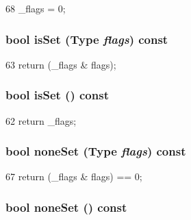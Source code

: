 \begin{DoxyCode}
68 { _flags = 0; }
\end{DoxyCode}
\hypertarget{classFlags_aaf4d0865ccb7b4e5278a619ee93e1241}{
\subsubsection[{isSet}]{\setlength{\rightskip}{0pt plus 5cm}bool isSet ({\bf Type} {\em flags}) const}}
\label{classFlags_aaf4d0865ccb7b4e5278a619ee93e1241}



\begin{DoxyCode}
63 { return (_flags & flags); }
\end{DoxyCode}
\hypertarget{classFlags_ac976964169b81aaba1d4cbb422f559ca}{
\subsubsection[{isSet}]{\setlength{\rightskip}{0pt plus 5cm}bool isSet () const}}
\label{classFlags_ac976964169b81aaba1d4cbb422f559ca}



\begin{DoxyCode}
62 { return _flags; }
\end{DoxyCode}
\hypertarget{classFlags_a593c66ded65e09a0bae20c243eb45066}{
\subsubsection[{noneSet}]{\setlength{\rightskip}{0pt plus 5cm}bool noneSet ({\bf Type} {\em flags}) const}}
\label{classFlags_a593c66ded65e09a0bae20c243eb45066}



\begin{DoxyCode}
67 { return (_flags & flags) == 0; }
\end{DoxyCode}
\hypertarget{classFlags_af3d473e1675288811ae75089c45bdced}{
\subsubsection[{noneSet}]{\setlength{\rightskip}{0pt plus 5cm}bool noneSet () const}}
\label{classFlags_af3d473e1675288811ae75089c45bdced}




